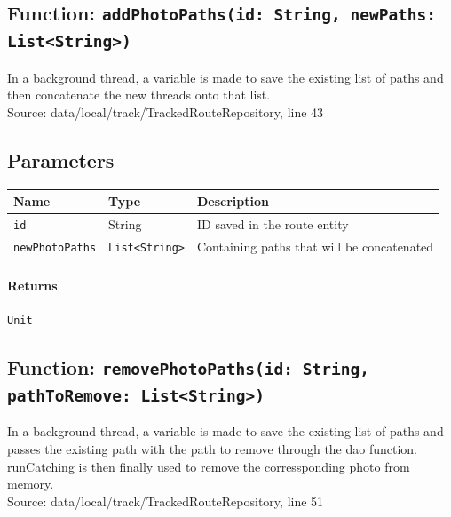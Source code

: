 \documentclass{article}
\begin{document}
            \subsection*{Function: \texttt{addPhotoPaths(id: String, newPaths: List<String>)}}

                In a background thread, a variable is made to save the existing list of
                paths and then concatenate the new threads onto that list. \\
                Source: data/local/track/TrackedRouteRepository, line 43
                
                \subsection*{Parameters}

                \begin{tabular}{p{3cm} p{4cm} p{7cm}}
                \toprule
                \textbf{Name} & \textbf{Type} & \textbf{Description} \\ \midrule
                \texttt{id} & String & ID saved in the route entity \\ \addlinespace
                \texttt{newPhotoPaths} & \texttt{List<String>} & Containing paths that will be concatenated \\ \bottomrule
                \end{tabular}

                \paragraph{Returns} \texttt{Unit} 

            \hrulefill

            \subsection*{Function: \texttt{removePhotoPaths(id: String, pathToRemove: List<String>)}}

                In a background thread, a variable is made to save the existing list of
                paths and passes the existing path with the path to remove through the dao
                function. runCatching is then finally used to remove the corressponding photo from
                memory. \\
                Source: data/local/track/TrackedRouteRepository, line 51
                
\end{document}
